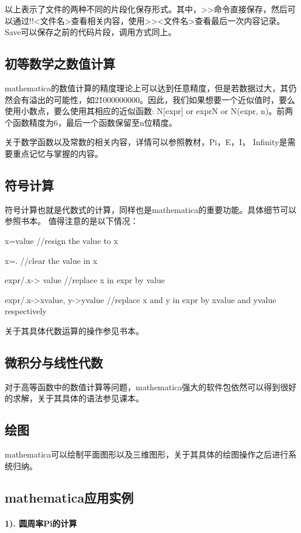\documentclass[UTF8]{ctexart}
\begin{document}
  以上表示了文件的两种不同的片段化保存形式。其中，>>命令直接保存，然后可以通过!!<文件名>查看相关内容，使用>><文件名>查看最后一次内容记录。Save可以保存之前的代码片段，调用方式同上。

  \subsection{初等数学之数值计算}
  mathematica的数值计算的精度理论上可以达到任意精度，但是若数据过大，其仍然会有溢出的可能性，如2\^1000000000。因此，我们如果想要一个近似值时，要么使用小数点，要么使用其相应的近似函数: N[expr] or expr\/\/N or N(expr, n)。前两个函数精度为6，最后一个函数保留至n位精度。

  关于数学函数以及常数的相关内容，详情可以参照教材，Pi，E，I， Infinity是需要重点记忆与掌握的内容。
  
  \subsection{符号计算}
  符号计算也就是代数式的计算，同样也是mathematica的重要功能。具体细节可以参照书本。
  值得注意的是以下情况：

  x=value //resign the value to x

  x=. //clear the value in x

  expr/.x-> value //replace x in expr by value

  expr/.{x->xvalue, y->yvalue}  //replace x and y in expr by xvalue and yvalue respectively

  关于其具体代数运算的操作参见书本。

  \subsection{微积分与线性代数}
  对于高等函数中的数值计算等问题，mathematica强大的软件包依然可以得到很好的求解，关于其具体的语法参见课本。

   
  \subsection{绘图}
  mathematica可以绘制平面图形以及三维图形，关于其具体的绘图操作之后进行系统归纳。


  \subsection{mathematica应用实例}
  \paragraph{1). 圆周率Pi的计算}
\end{document}
